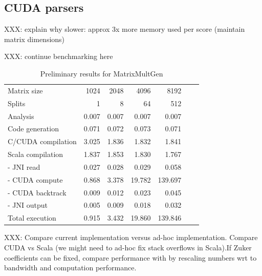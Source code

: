 \subsection{CUDA parsers}
{\color{red} XXX: explain why slower: approx 3x more memory used per score (maintain matrix dimensions)

XXX: continue benchmarking here
}
\begin{table}[H]\begin{center}\begin{tabular}{lrrrrrr} \toprule
Matrix size			& 1024	& 2048	& 4096	& 8192 \\
Splits				& 1		& 8		& 64		& 512 \\ \midrule
Analysis				& 0.007	& 0.007	& 0.007	& 0.007 \\
Code generation		& 0.071	& 0.072	& 0.073	& 0.071 \\
C/CUDA compilation	& 3.025	& 1.836	& 1.832	& 1.841 \\
Scala compilation		& 1.837	& 1.853	& 1.830	& 1.767 \\ \midrule
- JNI read				& 0.027	& 0.028	& 0.029	& 0.058 \\
- CUDA compute		& 0.868	& 3.378	& 19.782	& 139.697 \\
- CUDA backtrack		& 0.009	& 0.012	& 0.023	& 0.045 \\
- JNI output			& 0.005	& 0.009	& 0.018	& 0.032 \\
Total execution			& 0.915	& 3.432	& 19.860	& 139.846 \\ \bottomrule
\end{tabular}\end{center}\caption{Preliminary results for MatrixMultGen}\end{table}

{\color{red} XXX: Compare current implementation versus ad-hoc implementation. Compare CUDA vs Scala (we might need to ad-hoc fix stack overflows in Scala).If Zuker coefficients can be fixed, compare performance with \cite{adp_gpu} by rescaling numbers wrt to bandwidth and computation performance.}

